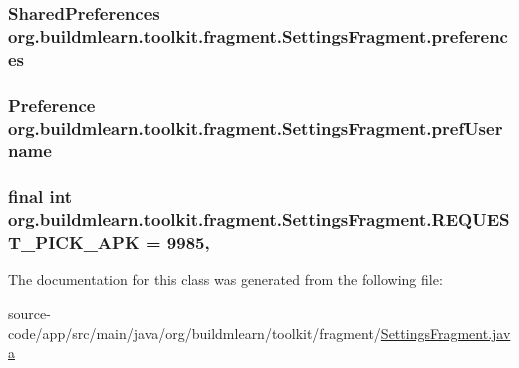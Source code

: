 \subsubsection[{\texorpdfstring{preferences}{preferences}}]{\setlength{\rightskip}{0pt plus 5cm}Shared\+Preferences org.\+buildmlearn.\+toolkit.\+fragment.\+Settings\+Fragment.\+preferences\hspace{0.3cm}{\ttfamily [private]}}\hypertarget{classorg_1_1buildmlearn_1_1toolkit_1_1fragment_1_1SettingsFragment_a25030d7c4bcf37c31464f8861bdd888c}{}\label{classorg_1_1buildmlearn_1_1toolkit_1_1fragment_1_1SettingsFragment_a25030d7c4bcf37c31464f8861bdd888c}
\subsubsection[{\texorpdfstring{pref\+Username}{prefUsername}}]{\setlength{\rightskip}{0pt plus 5cm}Preference org.\+buildmlearn.\+toolkit.\+fragment.\+Settings\+Fragment.\+pref\+Username\hspace{0.3cm}{\ttfamily [private]}}\hypertarget{classorg_1_1buildmlearn_1_1toolkit_1_1fragment_1_1SettingsFragment_a82ea20aa28be2d2f7aee02d939144c1e}{}\label{classorg_1_1buildmlearn_1_1toolkit_1_1fragment_1_1SettingsFragment_a82ea20aa28be2d2f7aee02d939144c1e}
\subsubsection[{\texorpdfstring{R\+E\+Q\+U\+E\+S\+T\+\_\+\+P\+I\+C\+K\+\_\+\+A\+PK}{REQUEST_PICK_APK}}]{\setlength{\rightskip}{0pt plus 5cm}final int org.\+buildmlearn.\+toolkit.\+fragment.\+Settings\+Fragment.\+R\+E\+Q\+U\+E\+S\+T\+\_\+\+P\+I\+C\+K\+\_\+\+A\+PK = 9985\hspace{0.3cm}{\ttfamily [static]}, {\ttfamily [private]}}\hypertarget{classorg_1_1buildmlearn_1_1toolkit_1_1fragment_1_1SettingsFragment_a7560e9f4d7da50c82e5a66854ccab436}{}\label{classorg_1_1buildmlearn_1_1toolkit_1_1fragment_1_1SettingsFragment_a7560e9f4d7da50c82e5a66854ccab436}


The documentation for this class was generated from the following file\+:\begin{DoxyCompactItemize}
\item 
source-\/code/app/src/main/java/org/buildmlearn/toolkit/fragment/\hyperlink{SettingsFragment_8java}{Settings\+Fragment.\+java}\end{DoxyCompactItemize}

